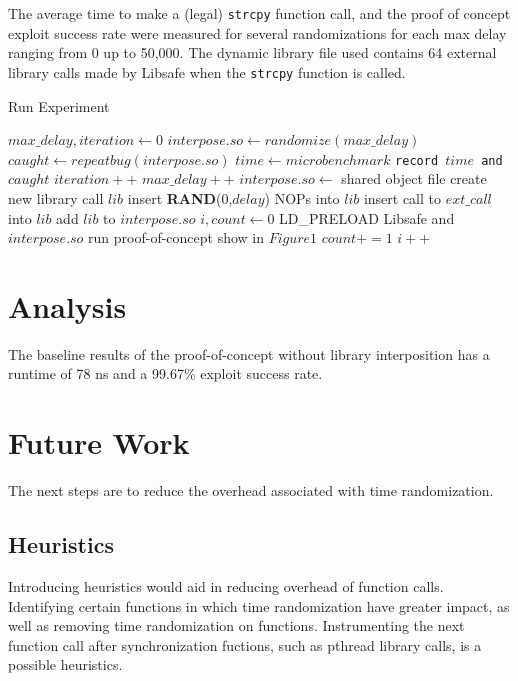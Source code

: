 \documentclass[letterpaper,twocolumn,10pt]{article}
\begin{document}
The average time to make a (legal) \texttt{strcpy} function call, and the proof of concept exploit success rate were measured for several randomizations for each max delay ranging from 0 up to 50,000.  The dynamic library file used contains 64 external library calls made by Libsafe when the \texttt{strcpy} function is called.

\begin{algorithm}
\caption{Run Experiment}
\begin{algorithmic}[1]
\State $max\_delay,iteration \gets 0$
		\State $interpose.so \gets randomize(max\_delay)$
		\State $caught \gets repeatbug(interpose.so)$
		\State $time \gets microbenchmark$
		\State \texttt{record $time$ and $caught$}
		\State $iteration++$
	\EndWhile
	\State $max\_delay++$
\EndWhile
\EndFunction
\State
{}
\State $interpose.so \gets$ shared object file
	\State create new library call $lib$
	\State insert \textbf{RAND}(0,$delay$) NOPs into $lib$
	\State insert call to $ext\_call$ into $lib$
	\State add $lib$ to $interpose.so$
\EndFor
\State {}
\EndFunction
\State
{}
\State $i,count \gets 0$
	\State LD\_PRELOAD Libsafe and $interpose.so$
	\State run proof-of-concept show in $Figure 1$
		\State $count += 1$
	\EndIf
	\State $i++$
\EndWhile
\State {}
\EndFunction
\end{algorithmic}
\end{algorithm}

\section{Analysis}
The baseline results of the proof-of-concept without library interposition has a runtime of 78 ns and a 99.67\% exploit success rate.  %
\section{Future Work}
The next steps are to reduce the overhead associated with time randomization.
\subsection{Heuristics}
Introducing heuristics would aid in reducing overhead of function calls.  Identifying certain functions in which time randomization have greater impact, as well as removing time randomization on functions. Instrumenting the next function call after synchronization fuctions, such as pthread library calls, is a possible heuristics.  
\end{document}
